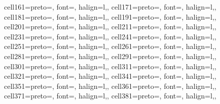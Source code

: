 \documentclass[
  12pt,
  letterpaper,
]{article}
\begin{document}
\begin{table}
{\begin{tblr}[         %
]
{cell{16}{1}={}{preto={\hspace{2em}}, font=\fontsize{0.8em}{1.1em}\selectfont, halign=l,},
cell{17}{1}={}{preto={\hspace{2em}}, font=\fontsize{0.8em}{1.1em}\selectfont, halign=l,},
cell{18}{1}={}{preto={\hspace{2em}}, font=\fontsize{0.8em}{1.1em}\selectfont, halign=l,},
cell{19}{1}={}{preto={\hspace{2em}}, font=\fontsize{0.8em}{1.1em}\selectfont, halign=l,},
cell{20}{1}={}{preto={\hspace{2em}}, font=\fontsize{0.8em}{1.1em}\selectfont, halign=l,},
cell{21}{1}={}{preto={\hspace{2em}}, font=\fontsize{0.8em}{1.1em}\selectfont, halign=l,},
cell{23}{1}={}{preto={\hspace{2em}}, font=\fontsize{0.8em}{1.1em}\selectfont, halign=l,},
cell{24}{1}={}{preto={\hspace{2em}}, font=\fontsize{0.8em}{1.1em}\selectfont, halign=l,},
cell{25}{1}={}{preto={\hspace{2em}}, font=\fontsize{0.8em}{1.1em}\selectfont, halign=l,},
cell{26}{1}={}{preto={\hspace{2em}}, font=\fontsize{0.8em}{1.1em}\selectfont, halign=l,},
cell{28}{1}={}{preto={\hspace{2em}}, font=\fontsize{0.8em}{1.1em}\selectfont, halign=l,},
cell{29}{1}={}{preto={\hspace{2em}}, font=\fontsize{0.8em}{1.1em}\selectfont, halign=l,},
cell{30}{1}={}{preto={\hspace{2em}}, font=\fontsize{0.8em}{1.1em}\selectfont, halign=l,},
cell{31}{1}={}{preto={\hspace{2em}}, font=\fontsize{0.8em}{1.1em}\selectfont, halign=l,},
cell{32}{1}={}{preto={\hspace{2em}}, font=\fontsize{0.8em}{1.1em}\selectfont, halign=l,},
cell{34}{1}={}{preto={\hspace{2em}}, font=\fontsize{0.8em}{1.1em}\selectfont, halign=l,},
cell{35}{1}={}{preto={\hspace{2em}}, font=\fontsize{0.8em}{1.1em}\selectfont, halign=l,},
cell{36}{1}={}{preto={\hspace{2em}}, font=\fontsize{0.8em}{1.1em}\selectfont, halign=l,},
cell{37}{1}={}{preto={\hspace{2em}}, font=\fontsize{0.8em}{1.1em}\selectfont, halign=l,},
cell{38}{1}={}{preto={\hspace{2em}}, font=\fontsize{0.8em}{1.1em}\selectfont, halign=l,},
}
\end{tblr}}
\end{table}
\end{document}
